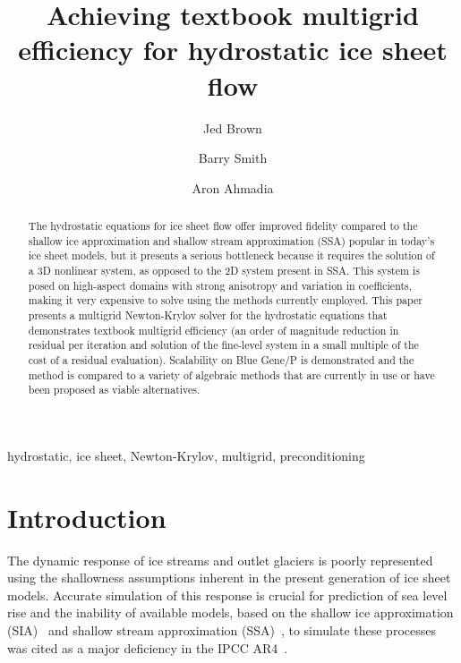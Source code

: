 \documentclass[3p]{elsarticle}
\begin{document}
\begin{frontmatter}
  \title{Achieving textbook multigrid efficiency for hydrostatic ice sheet flow}

  \author[vaw]{Jed Brown} 
  \author[mcs]{Barry Smith} 
  \author[kaust]{Aron Ahmadia} 

  \address[vaw]{Versuchsanstalt f\"ur Wasserbau, Hydrologie und Glaziologie (VAW), ETH Z\"urich, 8092     Z\"urich, Switzerland}
  \address[mcs]{Mathematics and Computer Science Division, Argonne National Laboratory, Argonne, IL     60439}
  \address[kaust]{KAUST-IBM Center for Deep Computing Research, Bldg \#1, Office 01-123,
    4700 King Abdullah University of Science and Technology,
    Thuwal Makkah 23955-6900,
    Kingdom of Saudi Arabia}

  \begin{abstract}
    The hydrostatic equations for ice sheet flow offer improved fidelity compared to the shallow ice approximation and shallow stream approximation (SSA) popular in today's ice sheet models, but it presents a serious bottleneck because it requires the solution of a 3D nonlinear system, as opposed to the 2D system present in SSA.  This system is posed on high-aspect domains with strong anisotropy and variation in coefficients, making it very expensive to solve using the methods currently employed.  This paper presents a multigrid Newton-Krylov solver for the hydrostatic equations that demonstrates textbook multigrid efficiency (an order of magnitude reduction in residual per iteration and solution of the fine-level system in a small multiple of the cost of a residual evaluation).  Scalability on Blue Gene/P is demonstrated and the method is compared to a variety of algebraic methods that are currently in use or have been proposed as viable alternatives.
  \end{abstract}
  \begin{keyword}
    hydrostatic, ice sheet, Newton-Krylov, multigrid, preconditioning
  \end{keyword}
  \thispagestyle{plain}
\end{frontmatter}

\section{Introduction}
The dynamic response of ice streams and outlet glaciers is poorly represented using the shallowness
assumptions inherent in the present generation of ice sheet models.  Accurate simulation of this
response is crucial for prediction of sea level rise and the inability of available models, based on
the shallow ice approximation (SIA)~\cite{hutter1983tgm} and shallow stream approximation
(SSA)~\cite{morland1987unconfined,weis1999theory}, to simulate these processes was cited as a major
deficiency in the IPCC AR4~\cite{ipcc2007ar4-syr}.
\end{document}
